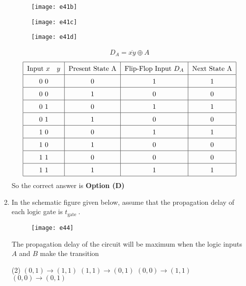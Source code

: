 \begin{enumerate}
\begin{tasks}
\begin{figure}[H]
\end{figure}
\task[\textbf{B.}] \begin{figure}[H]
	\centering
	\texttt{[image: e41b]}
\end{figure}
\task[\textbf{C.}] \begin{figure}[H]
	\centering
	\texttt{[image: e41c]}
\end{figure}
\task[\textbf{D.}] \begin{figure}[H]
	\centering
	\texttt{[image: e41d]}
\end{figure}
\end{tasks}
\begin{answer}
\begin{align*}
D_{A}=\overline{x y} \oplus A
\end{align*}
\begin{align*}
\renewcommand*{\arraystretch}{1.5}
\begin{tabular}{|c|c|c|c|}
\hline
Input
$x \quad y$&Present
State A&Flip-Flop
Input $D_{A}$&Next State
$\mathrm{A}$\\
\hline
0 0&0&1&1\\
\hline
0 0&1&0&0\\
\hline
0 1&0&1&1\\
\hline
0 1&1&0&0\\
\hline
1 0&0&1&1\\
\hline
1 0& 1& 0&0\\
\hline
1 1&0&0&0\\
\hline
1 1&1&1&1\\
\hline
\end{tabular}
\end{align*}
So the correct answer is \textbf{Option (D)}
\end{answer}
	\item In the schematic figure given below, assume that the propagation delay of each logic gate is $t_{\text {gate }}$.\\
	\begin{figure}[H]
		\centering
		\texttt{[image: e44]}
	\end{figure}
	The propagation delay of the circuit will be maximum when the logic inputs $A$ and $B$ make the transition
	{}
\begin{tasks}(2)
\task[\textbf{A.}] $(0,1) \rightarrow(1,1)$
\task[\textbf{B.}] $(1,1) \rightarrow(0,1)$
\task[\textbf{C.}] $(0,0) \rightarrow(1,1)$
\task[\textbf{D.}] 	$(0,0) \rightarrow(0,1)$
\end{tasks}

\end{enumerate}
